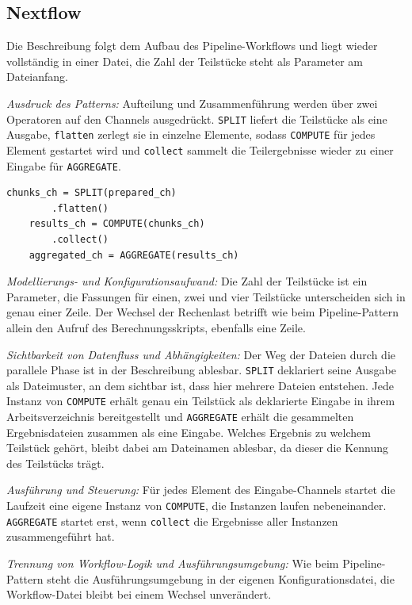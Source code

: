 \subsection{Nextflow}
\label{sec:lokal:sg:nextflow}

Die Beschreibung folgt dem Aufbau des Pipeline-Workflows und liegt
wieder vollständig in einer Datei, die Zahl der Teilstücke steht als
Parameter am Dateianfang.

\emph{Ausdruck des Patterns:} Aufteilung und Zusammenführung werden
über zwei Operatoren auf den Channels ausgedrückt. \texttt{SPLIT}
liefert die Teilstücke als eine Ausgabe, \texttt{flatten} zerlegt sie
in einzelne Elemente, sodass \texttt{COMPUTE} für jedes Element
gestartet wird und \texttt{collect} sammelt die Teilergebnisse
wieder zu einer Eingabe für \texttt{AGGREGATE}.

\begin{lstlisting}[caption={Fan-out und Fan-in im workflow-Block (Nextflow, Scatter-Gather)},label={lst:sg:nf}]
    chunks_ch = SPLIT(prepared_ch)
        .flatten()
    results_ch = COMPUTE(chunks_ch)
        .collect()
    aggregated_ch = AGGREGATE(results_ch)
\end{lstlisting}

\emph{Modellierungs- und Konfigurationsaufwand:} Die Zahl der
Teilstücke ist ein Parameter, die Fassungen für einen, zwei und vier
Teilstücke unterscheiden sich in genau einer Zeile. Der Wechsel der
Rechenlast betrifft wie beim Pipeline-Pattern allein den Aufruf des
Berechnungsskripts, ebenfalls eine Zeile.

\emph{Sichtbarkeit von Datenfluss und Abhängigkeiten:} Der Weg der
Dateien durch die parallele Phase ist in der Beschreibung ablesbar.
\texttt{SPLIT} deklariert seine Ausgabe als Dateimuster, an dem
sichtbar ist, dass hier mehrere Dateien entstehen. Jede Instanz von
\texttt{COMPUTE} erhält genau ein Teilstück als deklarierte Eingabe
in ihrem Arbeitsverzeichnis bereitgestellt und \texttt{AGGREGATE}
erhält die gesammelten Ergebnisdateien zusammen als eine Eingabe.
Welches Ergebnis zu welchem Teilstück gehört, bleibt dabei am
Dateinamen ablesbar, da dieser die Kennung des Teilstücks trägt.

\emph{Ausführung und Steuerung:} Für jedes Element des
Eingabe-Channels startet die Laufzeit eine eigene Instanz von
\texttt{COMPUTE}, die Instanzen laufen nebeneinander.
\texttt{AGGREGATE} startet erst, wenn \texttt{collect} die Ergebnisse
aller Instanzen zusammengeführt hat.

\emph{Trennung von Workflow-Logik und Ausführungsumgebung:} Wie beim
Pipeline-Pattern steht die Ausführungsumgebung in der eigenen
Konfigurationsdatei, die Workflow-Datei bleibt bei einem Wechsel
unverändert.


